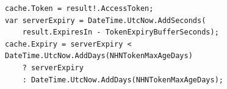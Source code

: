 \begin{lstlisting}[language={[Sharp]C}, label=lst:nhn-token-cache]
cache.Token = result!.AccessToken;
var serverExpiry = DateTime.UtcNow.AddSeconds(
    result.ExpiresIn - TokenExpiryBufferSeconds);
cache.Expiry = serverExpiry < DateTime.UtcNow.AddDays(NHNTokenMaxAgeDays)
    ? serverExpiry
    : DateTime.UtcNow.AddDays(NHNTokenMaxAgeDays);
\end{lstlisting}